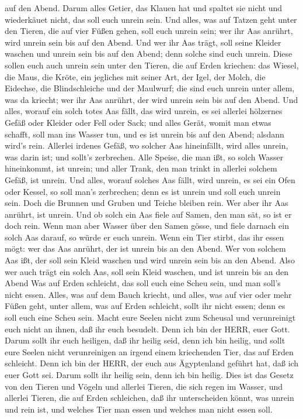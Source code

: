 auf den Abend.  Darum alles Getier, das Klauen hat und
spaltet sie nicht und wiederkäuet nicht, das soll euch unrein sein.
 Und alles, was auf Tatzen geht unter den Tieren, die auf
vier Füßen gehen, soll euch unrein sein; wer ihr Aas anrührt, wird
unrein sein bis auf den Abend.  Und wer ihr Aas trägt, soll
seine Kleider waschen und unrein sein bis auf den Abend; denn solche
sind euch unrein.  Diese sollen euch auch unrein sein unter
den Tieren, die auf Erden kriechen: das Wiesel, die Maus, die Kröte, ein
jegliches mit seiner Art,  der Igel, der Molch, die
Eidechse, die Blindschleiche und der Maulwurf;  die sind
euch unrein unter allem, was da kriecht; wer ihr Aas anrührt, der wird
unrein sein bis auf den Abend.  Und alles, worauf ein solch
totes Aas fällt, das wird unrein, es sei allerlei hölzernes Gefäß oder
Kleider oder Fell oder Sack; und alles Gerät, womit man etwas schafft,
soll man ins Wasser tun, und es ist unrein bis auf den Abend; alsdann
wird's rein.  Allerlei irdenes Gefäß, wo solcher Aas
hineinfällt, wird alles unrein, was darin ist; und sollt's zerbrechen.
 Alle Speise, die man ißt, so solch Wasser hineinkommt, ist
unrein; und aller Trank, den man trinkt in allerlei solchem Gefäß, ist
unrein.  Und alles, worauf solches Aas fällt, wird unrein,
es sei ein Ofen oder Kessel, so soll man's zerbrechen; denn es ist
unrein und soll euch unrein sein.  Doch die Brunnen und
Gruben und Teiche bleiben rein. Wer aber ihr Aas anrührt, ist unrein.
 Und ob solch ein Aas fiele auf Samen, den man sät, so ist
er doch rein.  Wenn man aber Wasser über den Samen gösse,
und fiele darnach ein solch Aas darauf, so würde er euch unrein.
 Wenn ein Tier stirbt, das ihr essen mögt: wer das Aas
anrührt, der ist unrein bis an den Abend.  Wer von solchem
Aas ißt, der soll sein Kleid waschen und wird unrein sein bis an den
Abend. Also wer auch trägt ein solch Aas, soll sein Kleid waschen, und
ist unrein bis an den Abend  Was auf Erden schleicht, das
soll euch eine Scheu sein, und man soll's nicht essen. 
Alles, was auf dem Bauch kriecht, und alles, was auf vier oder mehr
Füßen geht, unter allem, was auf Erden schleicht, sollt ihr nicht essen;
denn es soll euch eine Scheu sein.  Macht eure Seelen nicht
zum Scheusal und verunreinigt euch nicht an ihnen, daß ihr euch
besudelt.  Denn ich bin der HERR, euer Gott. Darum sollt
ihr euch heiligen, daß ihr heilig seid, denn ich bin heilig, und sollt
eure Seelen nicht verunreinigen an irgend einem kriechenden Tier, das
auf Erden schleicht.  Denn ich bin der HERR, der euch aus
Ägyptenland geführt hat, daß ich euer Gott sei. Darum sollt ihr heilig
sein, denn ich bin heilig.  Dies ist das Gesetz von den
Tieren und Vögeln und allerlei Tieren, die sich regen im Wasser, und
allerlei Tieren, die auf Erden schleichen,  daß ihr
unterscheiden könnt, was unrein und rein ist, und welches Tier man essen
und welches man nicht essen soll.

